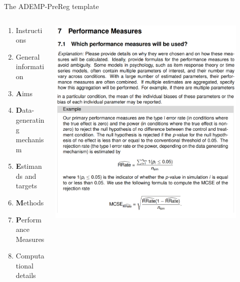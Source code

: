 \documentclass[english, 12pt, aspectratio=169]{beamer}
\begin{document}
\begin{frame}{The ADEMP-PreReg template}
  \begin{columns}
    \begin{column}{0.5\textwidth}
  \begin{block}{}
    \begin{enumerate}
    \item Instructions
    \item General information
    \item \alert{\textbf{A}}ims
    \item \alert{\textbf{D}}ata-generating mechanism
    \item \alert{\textbf{E}}stimands and targets
    \item \alert{\textbf{M}}ethods
    \item \alert{\textbf{P}}erformance Measures
    \item Computational details
    \pause
    \end{enumerate}
    \nocite{Burton2006}
  \end{block}
\end{column}
\begin{column}{0.5\textwidth}
  \centering
  \vspace{1em}

\includegraphics[width=0.9\textwidth,frame]{pics/7performance2.png}
\end{column}
\end{columns}
\end{frame}
\end{document}
